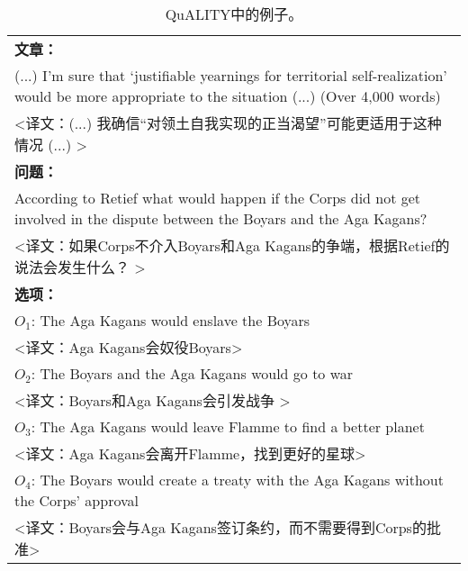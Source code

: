 \begin{table}[htbp]
    \centering
    \begin{tabular}{p{420pt}}
    \hline
    {\bfseries 文章：} \\
    (...) I'm sure that `justifiable yearnings for territorial self-realization' would be more appropriate to the situation (...) (Over 4,000 words) \\
    <译文：(...) 我确信“对领土自我实现的正当渴望”可能更适用于这种情况 (...) > \\
    \hline
    {\bfseries 问题：} \\
    According to Retief what would happen if the Corps did not get involved in the dispute between the Boyars and the Aga Kagans? \\
    <译文：如果Corps不介入Boyars和Aga Kagans的争端，根据Retief的说法会发生什么？ > \\
    \hline
    {\bfseries 选项：} \\
    $O_1$: \textcolor[rgb]{0.4,0.7,0.9}{The Aga Kagans would enslave the Boyars} \\
    <译文：Aga Kagans会奴役Boyars> \\
    $O_2$: \textcolor[rgb]{1,0.4,0.3}{The Boyars and the Aga Kagans would go to war} \\
    <译文：Boyars和Aga Kagans会引发战争 > \\
    $O_3$: The Aga Kagans would leave Flamme to find a better planet \\
    <译文：Aga Kagans会离开Flamme，找到更好的星球> \\
    \textbf{$O_4$}: The Boyars would create a treaty with the Aga Kagans without the Corps' approval \\
    <译文：Boyars会与Aga Kagans签订条约，而不需要得到Corps的批准> \\
    \hline
    \end{tabular}
    \caption{\label{tab:4-1}
    QuALITY中的例子。
    }
\end{table}
